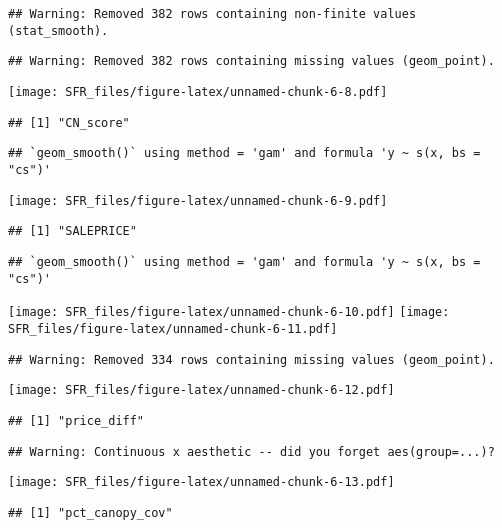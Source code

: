 \documentclass[]{article}
\begin{document}
\begin{verbatim}
## Warning: Removed 382 rows containing non-finite values (stat_smooth).
\end{verbatim}

\begin{verbatim}
## Warning: Removed 382 rows containing missing values (geom_point).
\end{verbatim}

\texttt{[image: SFR\_files/figure-latex/unnamed-chunk-6-8.pdf]}

\begin{verbatim}
## [1] "CN_score"
\end{verbatim}

\begin{verbatim}
## `geom_smooth()` using method = 'gam' and formula 'y ~ s(x, bs = "cs")'
\end{verbatim}

\texttt{[image: SFR\_files/figure-latex/unnamed-chunk-6-9.pdf]}

\begin{verbatim}
## [1] "SALEPRICE"
\end{verbatim}

\begin{verbatim}
## `geom_smooth()` using method = 'gam' and formula 'y ~ s(x, bs = "cs")'
\end{verbatim}

\texttt{[image: SFR\_files/figure-latex/unnamed-chunk-6-10.pdf]}
\texttt{[image: SFR\_files/figure-latex/unnamed-chunk-6-11.pdf]}

\begin{verbatim}
## Warning: Removed 334 rows containing missing values (geom_point).
\end{verbatim}

\texttt{[image: SFR\_files/figure-latex/unnamed-chunk-6-12.pdf]}

\begin{verbatim}
## [1] "price_diff"
\end{verbatim}

\begin{verbatim}
## Warning: Continuous x aesthetic -- did you forget aes(group=...)?
\end{verbatim}

\texttt{[image: SFR\_files/figure-latex/unnamed-chunk-6-13.pdf]}

\begin{verbatim}
## [1] "pct_canopy_cov"
\end{verbatim}
\end{document}
